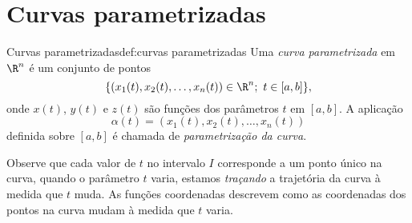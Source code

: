 \setcounter{chapter}{4}

\chapter{Curvas parametrizadas}







\begin{definition}{Curvas parametrizadas}{def:curvas parametrizadas}
Uma \textit{curva parametrizada} em $\R^n$ é um conjunto de pontos 
\[\{(x_1(t),x_2(t),\dots,x_n(t))\in\R^n;~t\in[a,b]\},\] 
onde \(x(t)\), \(y(t)\) e \(z(t)\) são funções dos parâmetros \(t\) em $[a,b]$. A aplicação 
$$\alpha(t)=(x_1(t),x_2(t),\dots,x_n(t))$$
definida sobre $[a,b]$ é chamada de \textit{parametrização da curva}\footnotemark.
\end{definition}


Observe que cada valor de \(t\) no intervalo \(I\) corresponde a um ponto único na curva, quando o parâmetro \(t\) varia, estamos \textit{traçando} a trajetória da curva à medida que \(t\) muda. As funções coordenadas descrevem como as coordenadas dos pontos na curva mudam à medida que \(t\) varia.

